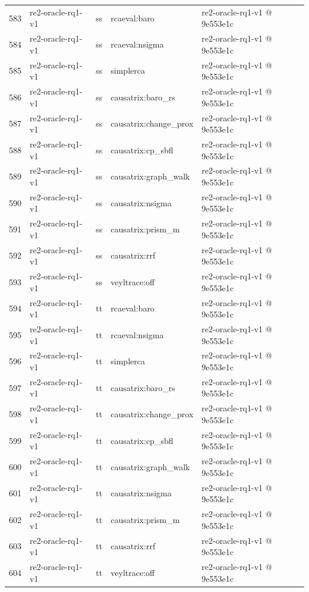 \begin{longtable}{@{}r>{\raggedright\arraybackslash}p{87.0pt}>{\raggedright\arraybackslash}p{18.0pt}>{\raggedright\arraybackslash}p{63.0pt}>{\raggedright\arraybackslash}p{108.0pt}@{}}
583 & re2-oracle-rq1-v1 & ss & rcaeval:baro & re2-oracle-rq1-v1 @ 9e553e1c \\
584 & re2-oracle-rq1-v1 & ss & rcaeval:nsigma & re2-oracle-rq1-v1 @ 9e553e1c \\
585 & re2-oracle-rq1-v1 & ss & simplerca & re2-oracle-rq1-v1 @ 9e553e1c \\
586 & re2-oracle-rq1-v1 & ss & causatrix:baro\_rs & re2-oracle-rq1-v1 @ 9e553e1c \\
587 & re2-oracle-rq1-v1 & ss & causatrix:change\_prox & re2-oracle-rq1-v1 @ 9e553e1c \\
588 & re2-oracle-rq1-v1 & ss & causatrix:cp\_sbfl & re2-oracle-rq1-v1 @ 9e553e1c \\
589 & re2-oracle-rq1-v1 & ss & causatrix:graph\_walk & re2-oracle-rq1-v1 @ 9e553e1c \\
590 & re2-oracle-rq1-v1 & ss & causatrix:nsigma & re2-oracle-rq1-v1 @ 9e553e1c \\
591 & re2-oracle-rq1-v1 & ss & causatrix:prism\_m & re2-oracle-rq1-v1 @ 9e553e1c \\
592 & re2-oracle-rq1-v1 & ss & causatrix:rrf & re2-oracle-rq1-v1 @ 9e553e1c \\
593 & re2-oracle-rq1-v1 & ss & veyltrace:off & re2-oracle-rq1-v1 @ 9e553e1c \\
594 & re2-oracle-rq1-v1 & tt & rcaeval:baro & re2-oracle-rq1-v1 @ 9e553e1c \\
595 & re2-oracle-rq1-v1 & tt & rcaeval:nsigma & re2-oracle-rq1-v1 @ 9e553e1c \\
596 & re2-oracle-rq1-v1 & tt & simplerca & re2-oracle-rq1-v1 @ 9e553e1c \\
597 & re2-oracle-rq1-v1 & tt & causatrix:baro\_rs & re2-oracle-rq1-v1 @ 9e553e1c \\
598 & re2-oracle-rq1-v1 & tt & causatrix:change\_prox & re2-oracle-rq1-v1 @ 9e553e1c \\
599 & re2-oracle-rq1-v1 & tt & causatrix:cp\_sbfl & re2-oracle-rq1-v1 @ 9e553e1c \\
600 & re2-oracle-rq1-v1 & tt & causatrix:graph\_walk & re2-oracle-rq1-v1 @ 9e553e1c \\
601 & re2-oracle-rq1-v1 & tt & causatrix:nsigma & re2-oracle-rq1-v1 @ 9e553e1c \\
602 & re2-oracle-rq1-v1 & tt & causatrix:prism\_m & re2-oracle-rq1-v1 @ 9e553e1c \\
603 & re2-oracle-rq1-v1 & tt & causatrix:rrf & re2-oracle-rq1-v1 @ 9e553e1c \\
604 & re2-oracle-rq1-v1 & tt & veyltrace:off & re2-oracle-rq1-v1 @ 9e553e1c \\

\end{longtable}
